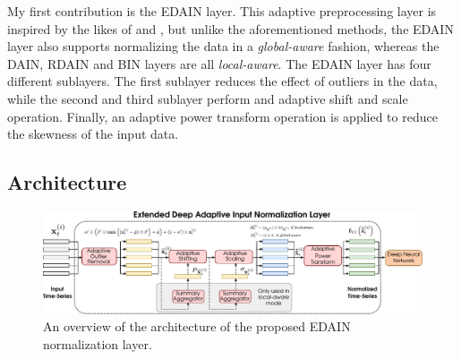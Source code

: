 \documentclass{statsmsc}
\begin{document}
{My first contribution is the \ac{EDAIN} layer. This adaptive preprocessing layer is inspired
by the likes of \citep{dain}  and \citep{bin}, but unlike the aforementioned methods, the
\ac{EDAIN} layer also supports normalizing the data in a \textit{global-aware} fashion, whereas
the \ac{DAIN}, \ac{RDAIN} and \ac{BIN} layers are all \textit{local-aware}.
The \ac{EDAIN} layer has four different sublayers. The first sublayer reduces the effect of
outliers in the data, while the second and third sublayer perform and adaptive shift and
scale operation. Finally, an adaptive power transform operation is applied to reduce the
skewness of the input data.

\subsection{Architecture}%
\label{sub:Architecture}

\begin{figure}
\begin{center}
    \includegraphics[width=\textwidth]{diagrams/edain-diagram.pdf}
\end{center}
\caption{An overview of the architecture of the proposed \ac{EDAIN} normalization layer.}
\label{fig:edain-arch}
\end{figure}

}
\end{document}
